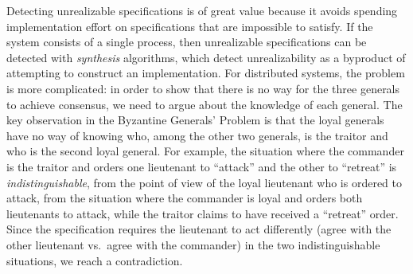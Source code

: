 \documentclass{LMCS}
\theoremstyle{plain}\newtheorem{theorem}[thm]{Theorem}
\theoremstyle{plain}\newtheorem{lemma}[thm]{Lemma}
\theoremstyle{plain}\newtheorem{proposition}[thm]{Proposition}
\theoremstyle{plain}\newtheorem{corollary}[thm]{Corollary}
\theoremstyle{definition}\newtheorem{definition}{Definition}[section]
\begin{document}
Detecting unrealizable specifications is of great value because it avoids spending implementation effort on specifications that are impossible to satisfy. If the system consists of a single process, then unrealizable specifications can be detected with \emph{synthesis} algorithms, which detect unrealizability as a byproduct of attempting to construct an implementation. For distributed systems, the problem is more complicated: in order to show that there is no way for the three generals to achieve consensus, we need to argue about the knowledge of each general. The key observation in the Byzantine Generals' Problem is that the loyal generals have no way of knowing who, among the other two generals, is the traitor and who is the second loyal general. For example, the situation where the commander is the traitor and orders one lieutenant to ``attack'' and the other to ``retreat'' is \emph{indistinguishable}, from the point of view of the loyal lieutenant who is ordered to attack, from the situation where the commander is loyal and orders both lieutenants to attack, while the traitor claims to have received a ``retreat'' order. Since the specification requires the lieutenant to act differently (agree with the other lieutenant vs.\ agree with the commander) in the two indistinguishable situations, we reach a contradiction. 
\end{document}
